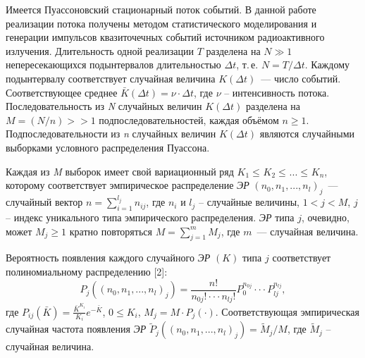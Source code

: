 













Имеется Пуассоновский стационарный поток событий.
В данной работе реализации потока получены методом статистического моделирования и генерации импульсов квазиточечных событий
источником радиоактивного излучения.
Длительность одной реализации $T$ разделена на $N \gg 1$ непересекающихся подынтервалов длительностью $\Delta t$,
т.\,е. $N=T/\Delta t$. Каждому подынтервалу соответствует случайная величина $K(\Delta t)$~--- число событий.
Соответствующее среднее $\bar{K}(\Delta t)=\nu \cdot \Delta t$, где $\nu $ -- интенсивность потока. Последовательность из \textit{N} случайных величин $K(\Delta t)$ разделена на $M=(N/n)>>1$  подпоследовательностей, каждая объёмом $n\geqslant 1$. Подпоследовательности из \textit{n}  случайных величин $K(\Delta t)$ являются случайными выборками условного распределения Пуассона.


Каждая из \textit{M} выборок имеет свой вариационный ряд $K_{1}  \leqslant _{} K_{2}  \leqslant _{}  ...  \leqslant _{} K{}_{n} $,
которому соответствует эмпирическое распределение {\it ЭР} $ ( n_{0} ,    n_{1} ,  ...  ,   n_{l}  )_{j} $~---
случайный вектор $n=\sum _{i=1}^{l_{j} }n_{ij}  $, где $n_{i} $ и $l_{j} $ --  случайные величины,
$1<j<M$, $j$ -- индекс уникального типа эмпирического распределения.
{\it ЭР}  типа  $j$, очевидно, может $M_{j} \geqslant 1$ кратно повторяться $M=\sum _{j=1}^{m}M_{j}  $, где $m$~--- случайная величина.


Вероятность появления каждого случайного {\it ЭР} $ (K)$ типа $j$ соответствует полиномиальному распределению [2]:
\[P_{j} (( n_{0} ,  n_{1} ,  ...  ,  n_{l}  )_{j} )=\frac{n!}{n_{0j} !\cdot \cdot \cdot n_{lj} !} P_{0}^{n_{0j} } \cdot \cdot \cdot P_{lj}^{n_{lj} } ,\]
где $P_{ij} (\bar{K})=\frac{\bar{K}^{K_{i} } }{K_{i} } e^{-\bar{K}} $, $0\leqslant K_{i} $, $M_{j} =M\cdot P_{j} (\cdot)$. Соответствующая эмпирическая случайная частота появления {\it ЭР}    $\tilde{P}_{j} (( n_{0} ,  n_{1} ,  ...  ,  n_{l}  )_{j} )=\tilde{M}_{j} /M$, где $\tilde{M}_{j} $ --  случайная величина.


